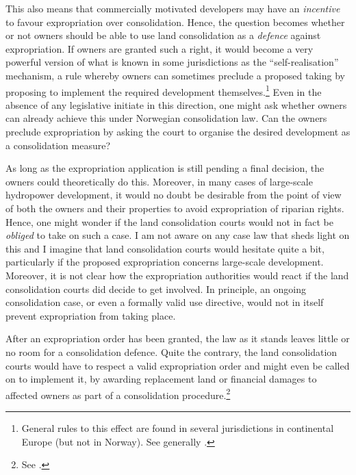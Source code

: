 This also means that commercially motivated developers may have an {\it incentive} to favour expropriation over consolidation. Hence, the question becomes whether or not owners should be able to use land consolidation as a {\it defence} against expropriation. If owners are granted such a right, it would become a very powerful version of what is known in some jurisdictions as the ``self-realisation'' mechanism, a rule whereby owners can sometimes preclude a proposed taking by proposing to implement the required development themselves.\footnote{General rules to this effect are found in several jurisdictions in continental Europe (but not in Norway). See generally \cite{sluysmans14}.}
Even in the absence of any legislative initiate in this direction, one might ask whether owners can already achieve this under Norwegian consolidation law. Can the owners preclude expropriation by asking the court to organise the desired development as a consolidation measure?

As long as the expropriation application is still pending a final decision, the owners could theoretically do this. Moreover, in many cases of large-scale hydropower development, it would no doubt be desirable from the point of view of both the owners and their properties to avoid expropriation of riparian rights. Hence, one might wonder if the land consolidation courts would not in fact be {\it obliged} to take on such a case. I am not aware on any case law that sheds light on this and I imagine that land consolidation courts would hesitate quite a bit, particularly if the proposed expropriation concerns large-scale development. Moreover, it is not clear how the expropriation authorities would react if the land consolidation courts did decide to get involved. In principle, an ongoing consolidation case, or even a formally valid use directive, would not in itself prevent expropriation from taking place.

After an expropriation order has been granted, the law as it stands leaves little or no room for a consolidation defence. Quite the contrary, the land consolidation courts would have to respect a valid expropriation order and might even be called on to implement it, by awarding replacement land or financial damages to affected owners as part of a consolidation procedure.\footnote{See \cite[6]{lca79}.}


